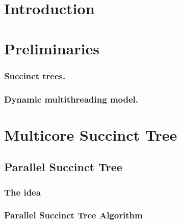 \documentclass[runningheads]{llncs}
\begin{document}
\section{Introduction}
\label{sec:introduction}




\section{Preliminaries}
\label{sec:relwork}


\subsubsection{Succinct trees.}
\label{subsec:suctrees}


\subsubsection{Dynamic multithreading model.}
\label{subsec:dym}


%


\section{Multicore Succinct Tree}
\label{sec:multicoreST}


\subsection{Parallel Succinct Tree}
\label{sec:PST}

\subsubsection{The idea}
\label{subsec:idea}


\subsubsection{Parallel Succinct Tree Algorithm}
\label{subsec:multicoreSTAlgorithm}

\end{document}
